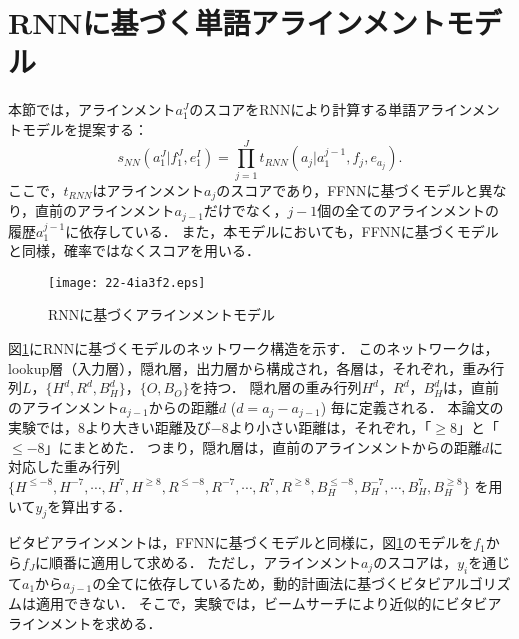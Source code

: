 \documentclass[japanese]{jnlp_1.4}
\begin{document}
\section{RNNに基づく単語アラインメントモデル}
\label{sect:RNN}

本節では，アラインメント$a_{1}^{J}$のスコアをRNNにより計算する単語アラインメントモデルを提案する：
\begin{equation}
\label{eqn:RNN1}
s_{NN}(a_{1}^{J}|f_{1}^{J},e_{1}^{I}) = \prod_{j=1}^{J}t_{RNN}(a_{j}|a_{1}^{j-1},f_{j},e_{a_{j}}).
\end{equation}
ここで，$t_{RNN}$はアラインメント$a_{j}$のスコアであり，FFNNに基づくモデルと異なり，直前のアラインメント$a_{j-1}$だけでなく，$j-1$個の全てのアラインメントの履歴$a_{1}^{j-1}$に依存している．
また，本モデルにおいても，FFNNに基づくモデルと同様，確率ではなくスコアを用いる．

\begin{figure}[b]
\begin{center}
\texttt{[image: 22-4ia3f2.eps]}
\end{center}
\caption{RNNに基づくアラインメントモデル}
\label{fig:RNN}
\end{figure}

図\ref{fig:RNN}にRNNに基づくモデルのネットワーク構造を示す．
このネットワークは，lookup層（入力層），隠れ層，出力層から構成され，各層は，それぞれ，重み行列$L$，$\{H^{d}, R^{d}, B_{H}^{d}\}$，$\{O,B_{O}\}$を持つ．
隠れ層の重み行列$H^{d}$，$R^{d}$，$B_{H}^{d}$は，直前のアラインメント$a_{j-1}$からの距離$d$ ($d=a_{j}-a_{j-1}$) 毎に定義される．
本論文の実験では，8より大きい距離及び$-8$より小さい距離は，それぞれ，「$\geq 8$」と「$\leq -8$」にまとめた．
つまり，隠れ層は，直前のアラインメントからの距離$d$に対応した重み行列$\{H^{\leq-8}, H^{-7}, \cdots, H^{7}, H^{\geq8}, R^{\leq-8}, R^{-7}, \cdots, R^{7}, R^{\geq8}, B_{H}^{\leq-8}, B_{H}^{-7}, \cdots, B_{H}^{7}, B_{H}^{\geq8}\}$ を用いて$y_{j}$を算出する．

ビタビアラインメントは，FFNNに基づくモデルと同様に，図\ref{fig:RNN}のモデルを$f_{1}$から$f_{J}$に順番に適用して求める．
ただし，アラインメント$a_{j}$のスコアは，$y_{i}$を通じて$a_{1}$から$a_{j-1}$の全てに依存しているため，動的計画法に基づくビタビアルゴリズムは適用できない．
そこで，実験では，ビームサーチにより近似的にビタビアラインメントを求める．
\end{document}
